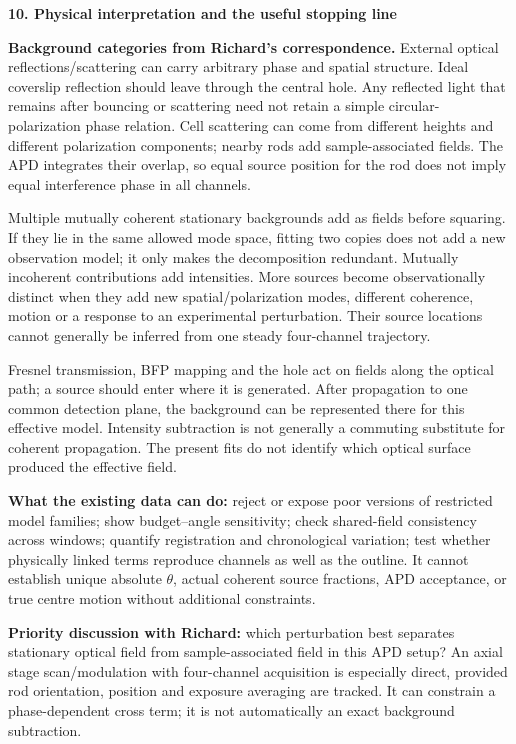 \documentclass[10pt,a4paper]{article}
\newcommand{\heading}[1]{{\sffamily\Large\bfseries\color{ink}#1}\par\vspace{7pt}}
\begin{document}
\heading{10. Physical interpretation and the useful stopping line}
\textbf{Background categories from Richard’s correspondence.} External optical reflections/scattering can carry arbitrary phase and spatial structure. Ideal coverslip reflection should leave through the central hole. Any reflected light that remains after bouncing or scattering need not retain a simple circular-polarization phase relation. Cell scattering can come from different heights and different polarization components; nearby rods add sample-associated fields. The APD integrates their overlap, so equal source position for the rod does not imply equal interference phase in all channels.\par
Multiple mutually coherent stationary backgrounds add as fields before squaring. If they lie in the same allowed mode space, fitting two copies does not add a new observation model; it only makes the decomposition redundant. Mutually incoherent contributions add intensities. More sources become observationally distinct when they add new spatial/polarization modes, different coherence, motion or a response to an experimental perturbation. Their source locations cannot generally be inferred from one steady four-channel trajectory.\par
Fresnel transmission, BFP mapping and the hole act on fields along the optical path; a source should enter where it is generated. After propagation to one common detection plane, the background can be represented there for this effective model. Intensity subtraction is not generally a commuting substitute for coherent propagation. The present fits do not identify which optical surface produced the effective field.\par
\textbf{What the existing data can do:} reject or expose poor versions of restricted model families; show budget–angle sensitivity; check shared-field consistency across windows; quantify registration and chronological variation; test whether physically linked terms reproduce channels as well as the outline. It cannot establish unique absolute \(θ\), actual coherent source fractions, APD acceptance, or true centre motion without additional constraints.\par
\textbf{Priority discussion with Richard:} which perturbation best separates stationary optical field from sample-associated field in this APD setup? An axial stage scan/modulation with four-channel acquisition is especially direct, provided rod orientation, position and exposure averaging are tracked. It can constrain a phase-dependent cross term; it is not automatically an exact background subtraction.\par
\end{document}
